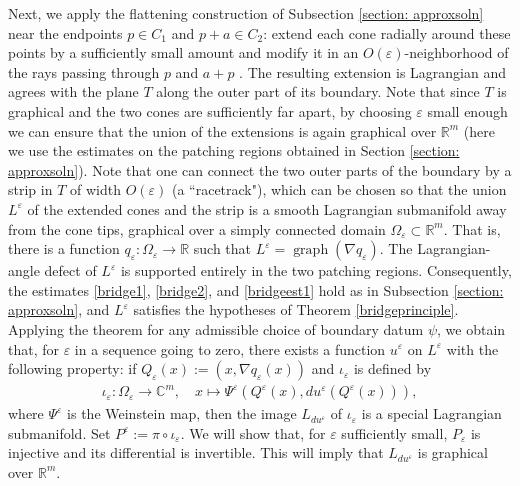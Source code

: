 \documentclass[11pt]{amsart}
\theoremstyle{definition}
\theoremstyle{remark}
\begin{document}
Next, we apply the flattening construction of Subsection \ref{section: approxsoln} near the endpoints $p\in C_1$ and $p+a\in C_2$: extend each cone radially around these points by a sufficiently small amount and modify it in an $O(\varepsilon)$-neighborhood of the rays passing through $p$ and $a+p$ . The resulting extension is Lagrangian and agrees with the plane $T$ along the outer part of its boundary. Note that since $T$ is graphical and the two cones are sufficiently far apart, by choosing $\varepsilon$ small enough we can ensure that the union of the extensions is again graphical over $\mathbb{R}^m$ (here we use the estimates on the patching regions obtained in Section \ref{section: approxsoln}). Note that one can connect the two outer parts of the boundary by a strip in $T$ of width $O(\varepsilon)$ (a ``racetrack"), which can be chosen so that the union $L^\varepsilon$ of the extended cones and the strip is a smooth Lagrangian submanifold away from the cone tips, graphical over a simply connected domain $\Omega_\varepsilon\subset \mathbb R^m$. That is, there is a function $q_\varepsilon: \Omega_\varepsilon\to\mathbb R$ such that $L^\varepsilon=\operatorname{graph}(\nabla q_\varepsilon)$.
The Lagrangian-angle defect of $L^\varepsilon$ is supported entirely in the two patching regions. Consequently, the estimates \eqref{bridge1}, \eqref{bridge2}, and \eqref{bridgeest1} hold as in Subsection \ref{section: approxsoln}, and $L^\varepsilon$ satisfies the hypotheses of Theorem \ref{bridgeprinciple}. Applying the theorem for any admissible choice of boundary datum $\psi$, we obtain that, for $\varepsilon$ in a sequence going to zero, there exists a function $u^\varepsilon$ on $L^\varepsilon$ with the following property: if $Q_\varepsilon(x):=(x,\nabla q_\varepsilon(x))$ and $\iota_\varepsilon$ is defined by
\begin{align*}
    \iota_\varepsilon: \Omega_\varepsilon\to \mathbb C^m, \quad x\mapsto \Psi^\varepsilon(Q^\varepsilon(x), du^\varepsilon(Q^\varepsilon(x))),
\end{align*}
where $\Psi^\varepsilon$ is the Weinstein map, then the image $L_{du^\varepsilon}$ of $\iota_\varepsilon$ is a special Lagrangian submanifold. Set $P^\varepsilon:=\pi\circ \iota_\varepsilon$. We will show that, for $\varepsilon$ sufficiently small, $P_\varepsilon$ is injective and its differential is invertible. This will imply that $L_{du^\varepsilon}$ is graphical over $\mathbb{R}^m$.
\end{document}
